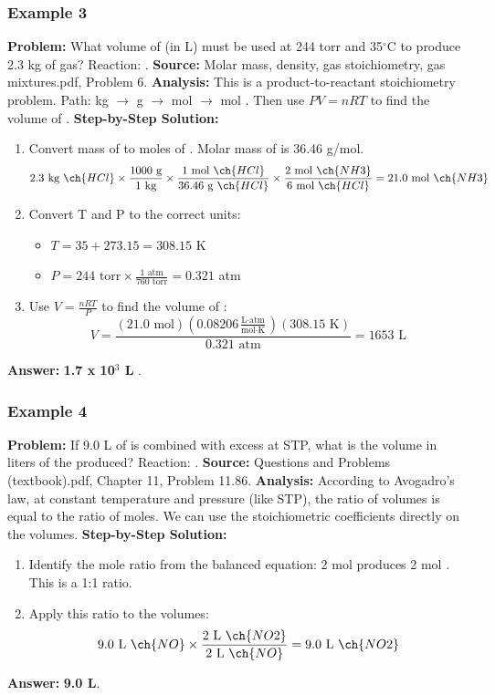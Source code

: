 \documentclass{article}
\begin{document}
\subsubsection{Example 3}
\textbf{Problem:} What volume of  (in L) must be used at 244 torr and 35$^\circ$C to produce 2.3 kg of  gas? Reaction: .
\textbf{Source:} Molar mass, density, gas stoichiometry, gas mixtures.pdf, Problem 6.
\textbf{Analysis:} This is a product-to-reactant stoichiometry problem. Path: kg  $\rightarrow$ g  $\rightarrow$ mol  $\rightarrow$ mol . Then use $PV=nRT$ to find the volume of .
\textbf{Step-by-Step Solution:}
\begin{enumerate}
    \item Convert mass of  to moles of . Molar mass of  is 36.46 g/mol.
    \[ 2.3 \text{ kg } \ch{HCl} \times \frac{1000 \text{ g}}{1 \text{ kg}} \times \frac{1 \text{ mol } \ch{HCl}}{36.46 \text{ g } \ch{HCl}} \times \frac{2 \text{ mol } \ch{NH3}}{6 \text{ mol } \ch{HCl}} = 21.0 \text{ mol } \ch{NH3} \]
    \item Convert T and P to the correct units:
    \begin{itemize}
        \item $T = 35 + 273.15 = 308.15$ K
        \item $P = 244 \text{ torr} \times \frac{1 \text{ atm}}{760 \text{ torr}} = 0.321$ atm
    \end{itemize}
    \item Use $V = \frac{nRT}{P}$ to find the volume of :
    \[ V = \frac{(21.0 \text{ mol})(0.08206 \frac{\text{L}\cdot\text{atm}}{\text{mol}\cdot\text{K}})(308.15 \text{ K})}{0.321 \text{ atm}} = 1653 \text{ L} \]
\end{enumerate}
\textbf{Answer:} \textbf{1.7 x 10$^3$ L }.

\subsubsection{Example 4}
\textbf{Problem:} If 9.0 L of  is combined with excess  at STP, what is the volume in liters of the  produced? Reaction: .
\textbf{Source:} Questions and Problems (textbook).pdf, Chapter 11, Problem 11.86.
\textbf{Analysis:} According to Avogadro's law, at constant temperature and pressure (like STP), the ratio of volumes is equal to the ratio of moles. We can use the stoichiometric coefficients directly on the volumes.
\textbf{Step-by-Step Solution:}
\begin{enumerate}
    \item Identify the mole ratio from the balanced equation: 2 mol  produces 2 mol . This is a 1:1 ratio.
    \item Apply this ratio to the volumes:
    \[ 9.0 \text{ L } \ch{NO} \times \frac{2 \text{ L } \ch{NO2}}{2 \text{ L } \ch{NO}} = 9.0 \text{ L } \ch{NO2} \]
\end{enumerate}
\textbf{Answer:} \textbf{9.0 L}.
\end{document}
